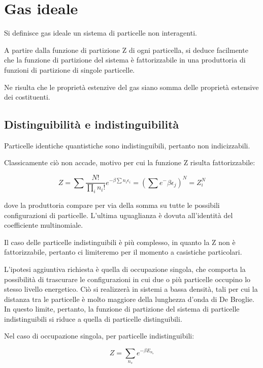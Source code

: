 \documentclass{article}
\begin{document}
\section{Gas ideale}
Si definisce gas ideale un sistema di particelle non interagenti.

A partire dalla funzione di partizione Z di ogni particella, si deduce facilmente che la funzione di partizione del sistema è fattorizzabile in una produttoria di funzioni di partizione di singole particelle.

Ne risulta che le proprietà estenzive del gas siano somma delle proprietà estensive dei costituenti.

\subsection{Distinguibilità e indistinguibilità}
Particelle identiche quantistiche sono indistinguibili, pertanto non indicizzabili.

Classicamente ciò non accade, motivo per cui la funzione Z risulta fattorizzabile:

\begin{equation}
    Z= \sum \frac{N!}{\prod_in_i!}e^{-\beta\sum n_i\epsilon_i}=\left(\sum e^-{\beta \epsilon_j}\right)^N=Z_i^N
\end{equation}

dove la produttoria compare per via della somma su tutte le possibili configurazioni di particelle. L'ultima uguaglianza è dovuta all'identità del coefficiente multinomiale.

Il caso delle particelle indistinguibili è più complesso, in quanto la Z non è fattorizzabile, pertanto ci limiteremo per il momento a casistiche particolari.

L'ipotesi aggiuntiva richiesta è quella di occupazione singola, che comporta la possibilità di trascurare le configurazioni in cui due o più particelle occupino lo stesso livello energetico.
Ciò si realizzerà in sistemi a bassa densità, tali per cui la distanza tra le particelle è molto maggiore della lunghezza d'onda di De Broglie.
In questo limite, pertanto, la funzione di partizione del sistema di particelle indistinguibili si riduce a quella di particelle distinguibili.

Nel caso di occupazione singola, per particelle indistinguibili:

\begin{equation}
    Z=\sum_{n_s} e^{-\beta E_{{n_s}}}
\end{equation}
\end{document}
